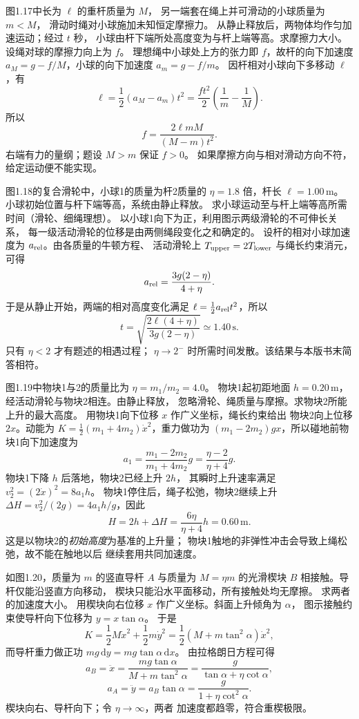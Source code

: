 图1.17中长为 $\ell$ 的重杆质量为 $M$，
另一端套在绳上并可滑动的小球质量为 $m<M$，
滑动时绳对小球施加未知恒定摩擦力。
从静止释放后，两物体均作匀加速运动；经过 $t$ 秒，
小球由杆下端所处高度变为与杆上端等高。求摩擦力大小。
\exsolution
设绳对球的摩擦力向上为 $f$。
理想绳中小球处上方的张力即 $f$，故杆的向下加速度
$a_M=g-f/M$，小球的向下加速度 $a_m=g-f/m$。
因杆相对小球向下多移动 $\ell$，有
\[
\ell=\frac12(a_M-a_m)t^2
=\frac{ft^2}{2}\left(\frac1m-\frac1M\right).
\]
所以
\[
\boxed{f=\frac{2\ell mM}{(M-m)t^2}}.
\]
\excheck 右端有力的量纲；题设 $M>m$ 保证 $f>0$。
如果摩擦方向与相对滑动方向不符，给定运动便不能实现。

图1.18的复合滑轮中，小球1的质量为杆2质量的
$\eta=1.8$ 倍，杆长 $\ell=1.00\,\mathrm m$。
小球初始位置与杆下端等高，系统由静止释放。
求小球运动至与杆上端等高所需时间（滑轮、细绳理想）。
\exsolution
以小球1向下为正，利用图示两级滑轮的不可伸长关系，
每一级活动滑轮的位移是由两侧绳段变化之和确定的。
设杆的相对小球加速度为 $a_{\rm rel}$。由各质量的牛顿方程、
活动滑轮上 $T_{\rm upper}=2T_{\rm lower}$ 与绳长约束消元，可得
\[
a_{\rm rel}=\frac{3g(2-\eta)}{4+\eta}.
\]
于是从静止开始，两端的相对高度变化满足
$\ell=\frac12a_{\rm rel}t^2$，所以
\[
\boxed{t=\sqrt{\frac{2\ell(4+\eta)}
 {3g(2-\eta)}}\simeq1.40\,\mathrm s}.
\]
\excheck 只有 $\eta<2$ 才有题述的相遇过程；
$\eta\to2^-$ 时所需时间发散。该结果与本版书末简答相符。

图1.19中物块1与2的质量比为 $\eta=m_1/m_2=4.0$。
物块1起初距地面 $h=0.20\,\mathrm m$，
经活动滑轮与物块2相连。由静止释放，
忽略滑轮、绳质量与摩擦。求物块2所能上升的最大高度。
\exsolution
用物块1向下位移 $x$ 作广义坐标，绳长约束给出
物块2向上位移 $2x$。动能为
$K=\frac12(m_1+4m_2)\dot x^2$，重力做功为
$(m_1-2m_2)gx$，所以碰地前物块1向下加速度为
\[
a_1=\frac{m_1-2m_2}{m_1+4m_2}g
=\frac{\eta-2}{\eta+4}g .
\]
物块1下降 $h$ 后落地，物块2已经上升 $2h$，
其瞬时上升速率满足 $v_2^2=(2\dot x)^2=8a_1h$。
物块1停住后，绳子松弛，物块2继续上升
$\Delta H=v_2^2/(2g)=4a_1h/g$，因此
\[
\boxed{H=2h+\Delta H=\frac{6\eta}{\eta+4}h
=0.60\,\mathrm m}.
\]
\excheck 这是以物块2的\emph{初始高度}为基准的上升量；
物块1触地的非弹性冲击会导致上绳松弛，故不能在触地以后
继续套用共同加速度。

如图1.20，质量为 $m$ 的竖直导杆 $A$ 与质量为
$M=\eta m$ 的光滑楔块 $B$ 相接触。导杆仅能沿竖直方向移动，
楔块只能沿水平面移动，所有接触处均无摩擦。
求两者的加速度大小。
\exsolution
用楔块向右位移 $x$ 作广义坐标。斜面上升倾角为 $\alpha$，
图示接触约束使导杆向下位移为 $y=x\tan\alpha$。
于是
\[
K=\frac12M\dot x^2+\frac12m\dot y^2
=\frac12(M+m\tan^2\alpha)\dot x^2,
\]
而导杆重力做正功 $mg\,\mathrm dy=mg\tan\alpha\,\mathrm dx$。
由拉格朗日方程可得
\[
a_B=\ddot x=\frac{mg\tan\alpha}{M+m\tan^2\alpha}
=\boxed{\frac{g}{\tan\alpha+\eta\cot\alpha}},
\]
\[
a_A=\ddot y=a_B\tan\alpha
=\boxed{\frac{g}{1+\eta\cot^2\alpha}}.
\]
\excheck 楔块向右、导杆向下；令 $\eta\to\infty$，两者
加速度都趋零，符合重楔极限。

